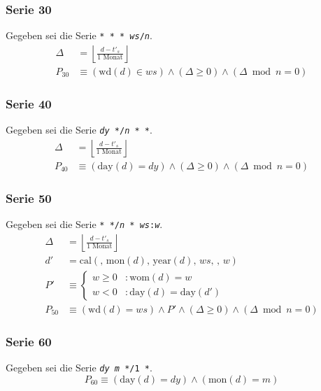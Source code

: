 \documentclass[a4paper]{article}
\newcommand*{\dayf}{\mathrm{day}}
\newcommand*{\monf}{\mathrm{mon}}
\newcommand*{\yearf}{\mathrm{year}}
\newcommand*{\wdf}{\mathrm{wd}}
\newcommand*{\womf}{\mathrm{wom}}
\newcommand*{\calf}{\mathrm{cal}}
\numberwithin{equation}{section}
\begin{document}
\subsubsection{Serie 30}
Gegeben sei die Serie \texttt{* * * \textit{ws}/\textit{n}}.
\begin{equation}
\begin{split}
  \Delta & = \left\lfloor\frac{d - t'_s}{1 \textrm{ Monat}}\right\rfloor \\
  P_{30} & \equiv (\wdf(d) \in ws) \wedge (\Delta \ge 0) \wedge (\Delta \bmod n = 0)
\end{split}
\end{equation}

\subsubsection{Serie 40}
Gegeben sei die Serie \texttt{\textit{dy} */\textit{n} * *}.
\begin{equation}
\begin{split}
  \Delta & = \left\lfloor\frac{d - t'_s}{1 \textrm{ Monat}}\right\rfloor \\
  P_{40} & \equiv (\dayf(d) = dy) \wedge (\Delta \ge 0) \wedge (\Delta \bmod n = 0)
\end{split}
\end{equation}

\subsubsection{Serie 50}
Gegeben sei die Serie \texttt{* */\textit{n} * \textit{ws}:\textit{w}}.
\begin{equation}
\begin{split}
  \Delta & = \left\lfloor\frac{d - t'_s}{1 \textrm{ Monat}}\right\rfloor \\
  d' & = \calf(,\,\monf(d),\,\yearf(d),\,ws,\,,\,w) \\
  P' & \equiv \left\{\begin{array}{ll}
      w \ge 0 & : \womf(d) = w \\
      w < 0 & : \dayf(d) = \dayf(d')
    \end{array}\right. \\
  P_{50} & \equiv (\wdf(d) = ws) \wedge P' \wedge
    (\Delta \ge 0) \wedge (\Delta \bmod n = 0)
\end{split}
\end{equation}

\subsubsection{Serie 60}
Gegeben sei die Serie \texttt{\textit{dy} \textit{m} */1 *}.
\begin{equation}
  P_{60} \equiv (\dayf(d) = dy) \wedge (\monf(d) = m)
\end{equation}
\end{document}
